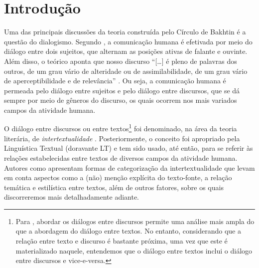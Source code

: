 \documentclass{textolivre}
\begin{document}
\begin{polyabstract}
\begin{english}
\begin{abstract}
\end{abstract}
\end{english}

\end{polyabstract}


\section{Introdução}\label{sec-intro}
Uma das principais discussões da teoria construída pelo Círculo de Bakhtin é a questão do dialogismo. Segundo \textcite{bakhtin_os_2011}, a comunicação humana é efetivada por meio do diálogo entre dois sujeitos, que alternam as posições ativas de falante e ouvinte. Além disso, o teórico aponta que nosso discurso “[…] é pleno de palavras dos outros, de um grau vário de alteridade ou de assimilabilidade, de um grau vário de aperceptibilidade e de relevância” \cite[p. 294-295]{bakhtin_os_2011}. Ou seja, a comunicação humana é permeada pelo diálogo entre sujeitos e pelo diálogo entre discursos, que se dá sempre por meio de gêneros do discurso, os quais ocorrem nos mais variados campos da atividade humana.

O diálogo entre discursos ou entre textos\footnote{Para \textcite{araujo_consideracoes_2009}, abordar os diálogos entre discursos permite uma análise mais ampla do que a abordagem do diálogo entre textos. No entanto, considerando que a relação entre texto e discurso é bastante próxima, uma vez que este é materializado naquele, entendemos que o diálogo entre textos inclui o diálogo entre discursos e vice-e-versa.} foi denominado, na área da teoria literária, de \textit{intertextualidade} \cite{kristeva_introducao_2005}. Posteriormente, o conceito foi apropriado pela Linguística Textual (doravante LT) e tem sido usado, até então, para se referir às relações estabelecidas entre textos de diversos campos da atividade humana. Autores como \textcite{koch__1991, koch_coerencia_2015, koch_intertextualidade:_2012} apresentam formas de categorização da intertextualidade que levam em conta aspectos como a (não) menção explícita do texto-fonte, a relação temática e estilística entre textos, além de outros fatores, sobre os quais discorreremos mais detalhadamente adiante.
\end{document}

